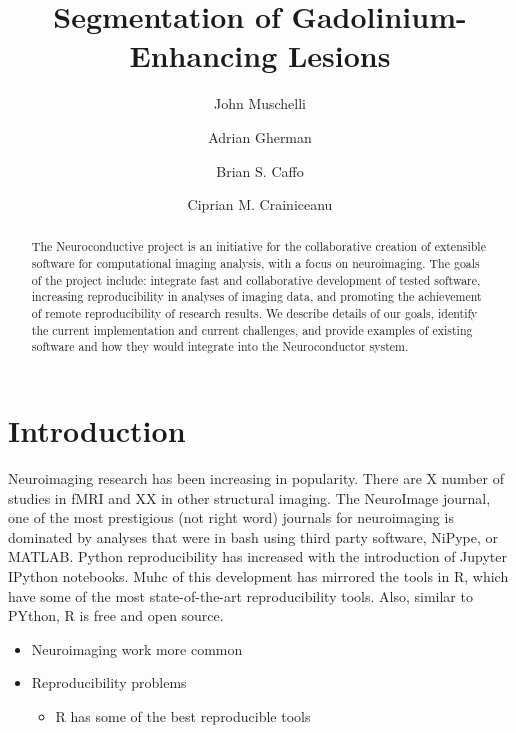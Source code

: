 \documentclass[]{elsarticle} %
\providecommand{\tightlist}{%
  \setlength{\itemsep}{0pt}\setlength{\parskip}{0pt}}
\begin{document}
\begin{frontmatter}

  \title{Segmentation of Gadolinium-Enhancing Lesions}
    \author[JHU]{John Muschelli}
    \author[JHU]{Adrian Gherman}
  
    \author[JHU]{Brian S. Caffo}
  
    \author[JHU]{Ciprian M. Crainiceanu}
  
      \address[JHU]{Johns Hopkins Bloomberg School of Public Health, Department of
Biostatistics, 615 N Wolfe St, Baltimore, MD, 21205}
  
  \begin{abstract}
  The Neuroconductive project is an initiative for the collaborative
  creation of extensible software for computational imaging analysis, with
  a focus on neuroimaging. The goals of the project include: integrate
  fast and collaborative development of tested software, increasing
  reproducibility in analyses of imaging data, and promoting the
  achievement of remote reproducibility of research results. We describe
  details of our goals, identify the current implementation and current
  challenges, and provide examples of existing software and how they would
  integrate into the Neuroconductor system.
  \end{abstract}
  
 \end{frontmatter}

\section{Introduction}\label{introduction}

Neuroimaging research has been increasing in popularity. There are X
number of studies in fMRI and XX in other structural imaging. The
NeuroImage journal, one of the most prestigious (not right word)
journals for neuroimaging is dominated by analyses that were in bash
using third party software, NiPype, or MATLAB. Python reproducibility
has increased with the introduction of Jupyter IPython notebooks. Muhc
of this development has mirrored the tools in R, which have some of the
most state-of-the-art reproducibility tools. Also, similar to PYthon, R
is free and open source.

\begin{itemize}
\tightlist
\item
  Neuroimaging work more common
\item
  Reproducibility problems

  \begin{itemize}
  \tightlist
  \item
    R has some of the best reproducible tools
  \end{itemize}
\end{itemize}
\end{document}
